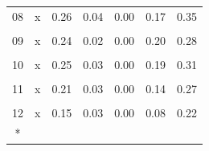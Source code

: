 \begin{longtable}[t]{ccrrrrr}
08 & x & 0.26 & 0.04 & 0.00 & 0.17 & 0.35\\
\cellcolor{gray!10}{09} & \cellcolor{gray!10}{(Intercept)} & \cellcolor{gray!10}{21648.88} & \cellcolor{gray!10}{2511.25} & \cellcolor{gray!10}{0.00} & \cellcolor{gray!10}{16177.35} & \cellcolor{gray!10}{27120.42}\\
09 & x & 0.24 & 0.02 & 0.00 & 0.20 & 0.28\\
\cellcolor{gray!10}{10} & \cellcolor{gray!10}{(Intercept)} & \cellcolor{gray!10}{13493.39} & \cellcolor{gray!10}{2155.81} & \cellcolor{gray!10}{0.00} & \cellcolor{gray!10}{8796.28} & \cellcolor{gray!10}{18190.50}\\
10 & x & 0.25 & 0.03 & 0.00 & 0.19 & 0.31\\
\cellcolor{gray!10}{11} & \cellcolor{gray!10}{(Intercept)} & \cellcolor{gray!10}{11836.11} & \cellcolor{gray!10}{1159.24} & \cellcolor{gray!10}{0.00} & \cellcolor{gray!10}{9310.35} & \cellcolor{gray!10}{14361.87}\\
11 & x & 0.21 & 0.03 & 0.00 & 0.14 & 0.27\\
\cellcolor{gray!10}{12} & \cellcolor{gray!10}{(Intercept)} & \cellcolor{gray!10}{7381.43} & \cellcolor{gray!10}{763.68} & \cellcolor{gray!10}{0.00} & \cellcolor{gray!10}{5717.51} & \cellcolor{gray!10}{9045.35}\\
12 & x & 0.15 & 0.03 & 0.00 & 0.08 & 0.22\\*
\end{longtable}
